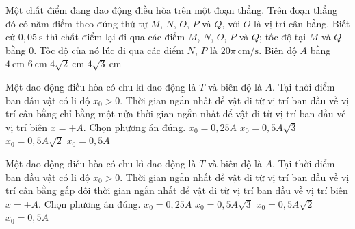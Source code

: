 \begin{ex}
Một chất điểm đang dao động điều hòa trên một đoạn thẳng. Trên đoạn thẳng đó có năm điểm theo đúng thứ tự $M$, $N$, $O$, $P$ và $Q$, với $O$ là vị trí cân bằng. Biết cứ $0,05\ \text{s}$ thì chất điểm lại đi qua các điểm $M$, $N$, $O$, $P$ và $Q$; tốc độ tại $M$ và $Q$ bằng $0$. Tốc độ của nó lúc đi qua các điểm $N$, $P$ là $20\pi\ \text{cm/s}$. Biên độ $A$ bằng
\choice
{$4\ \text{cm}$}
{$6\ \text{cm}$}
{\True $4\sqrt{2}\ \text{cm}$}
{$4\sqrt{3}\ \text{cm}$}
\end{ex}

\begin{ex}
Một dao động điều hòa có chu kì dao động là $T$ và biên độ là $A$. Tại thời điểm ban đầu vật có li độ $x_0\gt 0$. Thời gian ngắn nhất để vật đi từ vị trí ban đầu về vị trí cân bằng chỉ bằng một nửa thời gian ngắn nhất để vật đi từ vị trí ban đầu về vị trí biên $x=+A$. Chọn phương án đúng.
\choice
{$x_0=0{,}25A$}
{$x_0=0,5A\sqrt{3}$}
{$x_0=0,5A\sqrt{2}$}
{\True $x_0=0{,}5A$}
\end{ex}

\begin{ex}
Một dao động điều hòa có chu kì dao động là $T$ và biên độ là $A$. Tại thời điểm ban đầu vật có li độ $x_0\gt 0$. Thời gian ngắn nhất để vật đi từ vị trí ban đầu về vị trí cân bằng gấp đôi thời gian ngắn nhất để vật đi từ vị trí ban đầu về vị trí biên $x=+A$. Chọn phương án đúng.
\choice
{$x_0=0{,}25A$}
{\True $x_0=0,5A\sqrt{3}$}
{$x_0=0,5A\sqrt{2}$}
{$x_0=0{,}5A$}
\end{ex}

